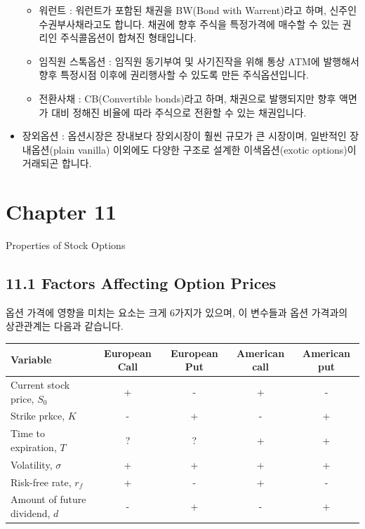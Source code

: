 \documentclass[
  letterpaper,
  DIV=11,
  numbers=noendperiod]{scrreprt}
\providecommand{\tightlist}{%
  \setlength{\itemsep}{0pt}\setlength{\parskip}{0pt}}\usepackage{longtable,booktabs,array}
\begin{document}
\begin{itemize}
  \begin{itemize}
  \tightlist
  \item
    워런트 : 워런트가 포함된 채권을 BW(Bond with Warrent)라고 하며,
    신주인수권부사채라고도 합니다. 채권에 향후 주식을 특정가격에 매수할
    수 있는 권리인 주식콜옵션이 합쳐진 형태입니다.
  \item
    임직원 스톡옵션 : 임직원 동기부여 및 사기진작을 위해 통상 ATM에
    발행해서 향후 특정시점 이후에 권리행사할 수 있도록 만든
    주식옵션입니다.
  \item
    전환사채 : CB(Convertible bonds)라고 하며, 채권으로 발행되지만 향후
    액면가 대비 정해진 비율에 따라 주식으로 전환할 수 있는 채권입니다.
  \end{itemize}
\item
  장외옵션 : 옵션시장은 장내보다 장외시장이 훨씬 규모가 큰 시장이며,
  일반적인 장내옵션(plain vanilla) 이외에도 다양한 구조로 설계한
  이색옵션(exotic options)이 거래되곤 합니다.
\end{itemize}


\chapter*{Chapter 11}\label{chapter-11}


Properties of Stock Options

\section*{11.1 Factors Affecting Option
Prices}\label{factors-affecting-option-prices}


옵션 가격에 영향을 미치는 요소는 크게 6가지가 있으며, 이 변수들과 옵션
가격과의 상관관계는 다음과 같습니다.

\begin{longtable}[]{@{}lcccc@{}}
\toprule\noalign{}
Variable & European Call & European Put & American call & American
put \\
\midrule\noalign{}
\endhead
\bottomrule\noalign{}
\endlastfoot
Current stock price, \(S_0\) & + & - & + & - \\
Strike prkce, \(K\) & - & + & - & + \\
Time to expiration, \(T\) & ? & ? & + & + \\
Volatility, \(\sigma\) & + & + & + & + \\
Risk-free rate, \(r_f\) & + & - & + & - \\
Amount of future dividend, \(d\) & - & + & - & + \\
\end{longtable}
\end{document}
